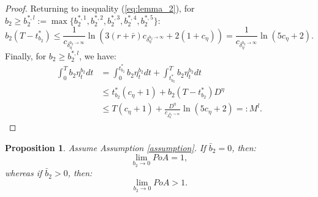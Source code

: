 \documentclass[11pt]{article}
\newtheorem{proposition}{Proposition}
\begin{document}
\begin{proof}
	Returning to inequality (\ref{eq:lemma_2}), for $b_2 \geq b_2^{*,l}:=\max \{b_2^{*,1},b_2^{*,2},b_2^{*,3},b_2^{*,4},b_2^{*,5}\}$:
	$$ b_2(T-t^*_{b_2})\leq \frac{1}{c_{\delta_\eta^{b_2 \to \infty}}} \ln \left(3 (r+\bar{r})c_{\delta_\eta^{b_2 \to \infty}}+2(1+c_\eta) \right)=\frac{1}{c_{\delta_\eta^{b_2 \to \infty}}} \ln \left(5c_\eta+2 \right).$$
	Finally, for $b_2 \geq b_2^{*,l}$, we have:
	\begin{equation*}
	\begin{split}
	\int_0^T b_2 \eta^{b_2}_t dt&=\int_0^{t^*_{b_2}} b_2 \eta^{b_2}_t dt+\int_{t^*_{b_2}}^T b_2 \eta^{b_2}_t dt \\
	&\leq t^*_{b_2}(c_\eta+1)+b_2 (T-t^*_{b_2})D^\eta\\
	&\leq T(c_\eta+1)+\frac{D^\eta}{c_{\delta_\eta^{b_2 \to \infty}}} \ln \left( 5c_\eta+2 \right)=:M^l.	
	\end{split}
	\end{equation*}
\end{proof}


\begin{proposition}
	Assume Assumption \ref{assumption}. If $\bar{b}_2= 0$, then:
	\begin{equation*}
	\lim_{b_2 \to 0} PoA = 1,
	\end{equation*}
	whereas if $\bar{b}_2 > 0$, then:
	\begin{equation*}
	\lim_{b_2 \to 0} PoA > 1.
	\end{equation*}
\label{prop:b2_to_0}
\end{proposition}
\end{document}
